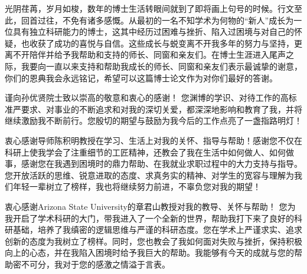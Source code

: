 \begin{thanks}




光阴荏苒，岁月如梭，数年的博士生活转眼间就到了即将画上句号的时候。行文至此，回首过往，不免有诸多感慨。从最初的一名不知学术为何物的“新人”成长为一位具有独立科研能力的博士，这其中经历过困难与挫折、陷入过困境与对自己的怀疑，也收获了成功的喜悦与自信。这些成长与蜕变离不开我多年的努力与坚持，更离不开陪伴并给予我帮助和支持的师长、同窗和亲友们。在博士生涯进入尾声之际，我要向一直以来支持和帮助我成长的师长、同窗和亲友们表示最诚挚的谢意，你们的恩典我会永远铭记，希望可以这篇博士论文作为对你们最好的答谢。



谨向孙优贤院士致以崇高的敬意和衷心的感谢！ 您渊博的学识、对待工作的高标准严要求、对事业的不断追求和对我的深切关爱，都深深地影响和教育了我，并将继续激励我不断前行。您殷切的期望与鼓励为我今后的工作点亮了一盏指路明灯！


衷心感谢导师陈积明教授在学习、生活上对我的关怀、指导与帮助！感谢您不仅在科研上使我学会了注重细节的工匠精神，还教会了我在生活中如何做人、如何做事，感谢您在我遇到困境时的鼎力帮助、在我就业求职过程中的大力支持与指导。您开放活跃的思维、锐意进取的态度、求真务实的精神、对学生的宽容与理解为我们年轻一辈树立了榜样，我也将继续努力前进，不辜负您对我的期望！


衷心感谢Arizona State University的章君山教授对我的教导、关怀与帮助！ 您为我开启了学术科研的大门，带我进入了一个全新的世界，帮助我打下来了良好的科研基础，培养了我缜密的逻辑思维与严谨的科研态度。您在学术上严谨求实、追求创新的态度为我树立了榜样。同时，您也教会了我如何面对失败与挫折，保持积极向上的心态，并在我陷入困境时给予我巨大的帮助。我能够有今天的成就与您的帮助密不可分，我对于您的感激之情溢于言表。



\end{thanks}
